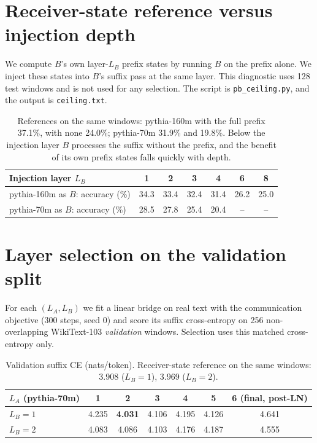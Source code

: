 \section{Receiver-state reference versus injection depth}
\label{app:ceiling}
We compute $B$'s own layer-$L_B$ prefix states by running $B$ on the prefix alone. We inject these states into $B$'s suffix pass at the same layer. This diagnostic uses 128 test windows and is not used for any selection. The script is \texttt{pb\_ceiling.py}, and the output is \texttt{ceiling.txt}.

\begin{table}[h]
\centering\small
\begin{tabular}{lcccccc}
\toprule
Injection layer $L_B$ & 1 & 2 & 3 & 4 & 6 & 8 \\
\midrule
pythia-160m as $B$: accuracy (\%) & 34.3 & 33.4 & 32.4 & 31.4 & 26.2 & 25.0 \\
pythia-70m as $B$: accuracy (\%) & 28.5 & 27.8 & 25.4 & 20.4 & -- & -- \\
\bottomrule
\end{tabular}
\caption{References on the same windows: pythia-160m with the full prefix 37.1\%, with none 24.0\%; pythia-70m 31.9\% and 19.8\%. Below the injection layer $B$ processes the suffix without the prefix, and the benefit of its own prefix states falls quickly with depth.}
\end{table}

\section{Layer selection on the validation split}
\label{app:sweep}
For each $(L_A, L_B)$ we fit a linear bridge on real text with the communication objective (300 steps, seed 0) and score its suffix cross-entropy on 256 non-overlapping WikiText-103 \emph{validation} windows. Selection uses this matched cross-entropy only.

\begin{table}[h]
\centering\small
\begin{tabular}{lcccccc}
\toprule
$L_A$ (pythia-70m) & 1 & 2 & 3 & 4 & 5 & 6 (final, post-LN) \\
\midrule
$L_B=1$ & 4.235 & \textbf{4.031} & 4.106 & 4.195 & 4.126 & 4.641 \\
$L_B=2$ & 4.083 & 4.086 & 4.103 & 4.176 & 4.187 & 4.555 \\
\bottomrule
\end{tabular}
\caption{Validation suffix CE (nats/token). Receiver-state reference on the same windows: 3.908 ($L_B=1$), 3.969 ($L_B=2$).}
\end{table}

